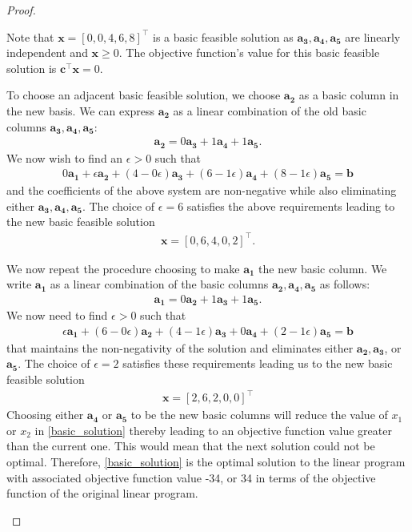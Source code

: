 \documentclass[12pt]{article}
\theoremstyle{definition}
\newcommand{\vect}[1]{\boldsymbol{#1}}
\begin{document}
\begin{proof}
\begin{enumerate}
    Note that
    $\vect{x} = [0, 0, 4, 6, 8]^\intercal$ is a basic feasible
    solution as $\vect{a_3}, \vect{a_4}, \vect{a_5}$ are linearly independent and $\vect{x} \geq 0$.
    The objective function's value for this basic feasible solution is $\vect{c}^\intercal \vect{x} = 0$.

    To choose an adjacent basic feasible solution, we choose $\vect{a_2}$ as a basic
    column in the new basis. We can express $\vect{a_2}$ as a linear combination
    of the old basic columns $\vect{a_3}, \vect{a_4}, \vect{a_5}$:
    \begin{align*}
      \vect{a_2} = 0\vect{a_3} + 1\vect{a_4} + 1\vect{a_5}.
    \end{align*}
    We now wish to find an $\epsilon > 0$ such that
    \begin{align*}
      0\vect{a_1} + \epsilon\vect{a_2} + (4 - 0\epsilon)\vect{a_3} + (6-1\epsilon)\vect{a_4} + (8-1\epsilon)\vect{a_5} = \vect{b}
    \end{align*}
    and the coefficients of the above system are non-negative while also eliminating
    either $\vect{a_3}, \vect{a_4}, \vect{a_5}$. The choice of $\epsilon = 6$ satisfies the
    above requirements leading to the new basic feasible solution
    \begin{align*}
      \vect{x} = [0, 6, 4, 0, 2]^\intercal.
    \end{align*}

    We now repeat the procedure choosing to make $\vect{a_1}$ the new basic
    column. We write $\vect{a_1}$ as a linear combination of the basic columns
    $\vect{a_2}, \vect{a_4}, \vect{a_5}$ as follows:
    \begin{align*}
      \vect{a_1} = 0\vect{a_2} + 1\vect{a_3} + 1\vect{a_5}.
    \end{align*}
    We now need to find $\epsilon > 0$ such that
    \begin{align*}
      \epsilon\vect{a_1} + (6-0\epsilon)\vect{a_2} + (4-1\epsilon)\vect{a_3} + 0\vect{a_4} + (2-1\epsilon)\vect{a_5} = \vect{b}
    \end{align*}
    that maintains the non-negativity of the solution and eliminates either $\vect{a_2}, \vect{a_3}$, or $\vect{a_5}$.
    The choice of $\epsilon = 2$ satisfies these requirements leading us to the new
    basic feasible solution
    \begin{align}\label{basic_solution}
      \vect{x} = [2, 6, 2, 0, 0]^\intercal
    \end{align}
    Choosing either $\vect{a_4}$ or $\vect{a_5}$ to be the new basic columns will
    reduce the value of $x_1$ or $x_2$ in \eqref{basic_solution} thereby leading to an objective function value greater than the current one. This would mean that the next solution
    could not be optimal. Therefore,
    \eqref{basic_solution} is the optimal solution to the linear program with
    associated objective function value -34, or 34 in terms of the objective
    function of the original linear program.
  \end{enumerate}
\end{proof}
\end{document}
